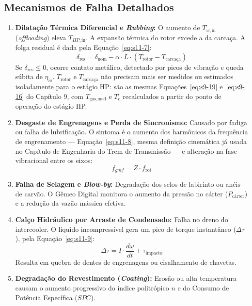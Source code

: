 \documentclass[12pt,a4paper]{article}
\numberwithin{equation}{section}
\numberwithin{table}{section}
\numberwithin{figure}{section}
\begin{document}
	\subsection{\textbf{Mecanismos de Falha Detalhados}}
	
	\begin{enumerate}
		\item \textbf{Dilatação Térmica Diferencial e \textit{Rubbing}:}
		O aumento de $T_{w,\text{in}}$ (\textit{offloading}) eleva $T_{HP,\text{in}}$. A expansão térmica do rotor excede a da carcaça. A folga residual é dada pela Equação~\eqref{eq:s11-7}:
		\begin{equation}\label{eq:s11-7}
 \delta_{\text{res}} = \delta_{\text{nom}} - \alpha \cdot L \cdot (T_{\text{rotor}} - T_{\text{carcaça}}) 
\end{equation}
		Se $\delta_{\text{res}} \le 0$, ocorre contato metálico, detectado por picos de vibração e queda súbita de $\eta_{is}$. $T_{\text{rotor}}$ e $T_{\text{carcaça}}$ não precisam mais ser medidos ou estimados isoladamente para o estágio HP: são as mesmas Equações~\eqref{eq:s9-19} e~\eqref{eq:s9-16} do Capítulo 9, com $T_{\text{gas,med}}$ e $T_c$ recalculados a partir do ponto de operação do estágio HP.

		\item \textbf{Desgaste de Engrenagens e Perda de Sincronismo:}
		Causado por fadiga ou falha de lubrificação. O sintoma é o aumento dos harmônicos da frequência de engrenamento — Equação~\eqref{eq:s11-8}, mesma definição cinemática já usada no Capítulo de Engenharia do Trem de Transmissão — e alteração na fase vibracional entre os eixos:
		\begin{equation}\label{eq:s11-8}
 f_{gmf} = Z \cdot f_{\text{rot}}
\end{equation}
		
		\item \textbf{Falha de Selagem e \textit{Blow-by}:}
		Degradação dos selos de labirinto ou anéis de carvão. O Gêmeo Digital monitora o aumento da pressão no cárter ($P_{\text{cárter}}$) e a redução da vazão mássica efetiva.
		
		\item \textbf{Calço Hidráulico por Arraste de Condensado:}
		Falha no dreno do intercooler. O líquido incompressível gera um pico de torque instantâneo ($\Delta \tau$), pela Equação~\eqref{eq:s11-9}:
		\begin{equation}\label{eq:s11-9}
 \Delta \tau = I \cdot \frac{d\omega}{dt} + \tau_{\text{impacto}}
\end{equation}
		Resulta em quebra de dentes de engrenagens ou cisalhamento de chavetas.
		
		\item \textbf{Degradação do Revestimento (\textit{Coating}):}
		Erosão ou alta temperatura causam o aumento progressivo do índice politrópico $n$ e do Consumo de Potência Específica ($SPC$).
	\end{enumerate}
	
\end{document}
